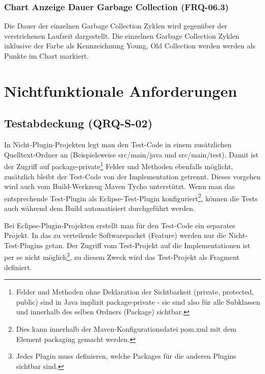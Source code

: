 \subsubsection{Chart Anzeige Dauer Garbage Collection (FRQ-06.3)}
Die Dauer der einzelnen Garbage Collection Zyklen wird gegenüber der verstrichenen Laufzeit dargestellt. Die einzelnen Garbage Collection Zyklen inklusive der Farbe als Kennzeichnung Young, Old Collection werden werden als Punkte im Chart markiert.


\section{Nichtfunktionale Anforderungen}
\subsection{Testabdeckung (QRQ-S-02)}\label{testing}
In Nicht-Plugin-Projekten legt man den Test-Code in einem zusätzlichen Quelltext-Ordner an (Beispielsweise src/main/java und src/main/test). Damit ist der Zugriff auf package-private\footnote{Felder und Methoden ohne Deklaration der Sichtbarkeit (private, protected, public) sind in Java implizit package-private - sie sind also für alle Subklassen und innerhalb des selben Ordners (Package) sichtbar. } Felder und Methoden ebenfalls möglicht, zusätzlich bleibt der Test-Code von der Implementation getrennt. Dieses vorgehen wird auch vom Build-Werkzeug Maven Tycho unterstützt. Wenn man das entsprechende Test-Plugin als Eclipse-Test-Plugin konfiguriert\footnote{Dies kann innerhalb der Maven-Konfigurationsdatei pom.xml mit dem Element packaging gemacht werden.}, können die Tests auch während dem Build automatisiert durchgeführt werden.

Bei Eclipse-Plugin-Projekten erstellt man für den Test-Code ein separates Projekt. In das zu verteilende Softwarepacket (Feature) werden nur die Nicht-Test-Plugins getan. Der Zugriff vom Test-Projekt auf die Implementationen ist per se nicht möglich\footnote{Jedes Plugin muss definieren, welche Packages für die anderen Plugins sichtbar sind.}, zu diesem Zweck wird das Test-Projekt als Fragment definiert.

